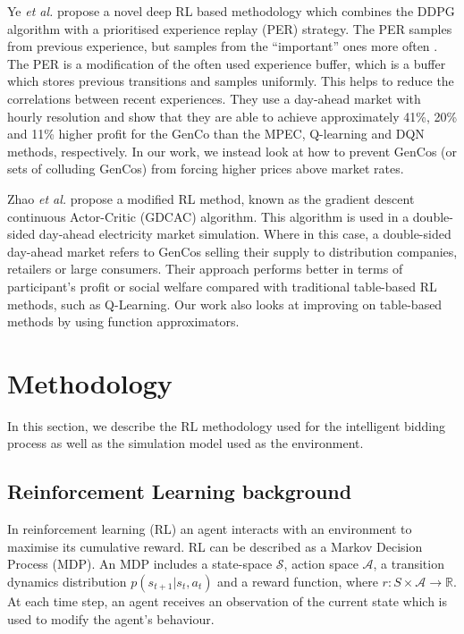Ye \textit{et al.} \cite{Ye2020a} propose a novel deep RL based methodology which combines the DDPG algorithm \cite{Hunt2016a} with a prioritised experience replay (PER) strategy\cite{schaul2015prioritized}. The PER samples from previous experience, but samples from the ``important'' ones more often \cite{Schaul2016}. The PER is a modification of the often used experience buffer, which is a buffer which stores previous transitions and samples uniformly. This helps to reduce the correlations between recent experiences. They use a day-ahead market with hourly resolution and show that they are able to achieve approximately 41\%, 20\% and 11\% higher profit for the GenCo than the MPEC, Q-learning and DQN methods, respectively. In our work, we instead look at how to prevent GenCos (or sets of colluding GenCos) from forcing higher prices above market rates.



Zhao \textit{et al.} \cite{Zhao2016} propose a modified RL method, known as the gradient descent continuous Actor-Critic (GDCAC) algorithm. This algorithm is used in a double-sided day-ahead electricity market simulation. Where in this case, a double-sided day-ahead market refers to GenCos selling their supply to distribution companies, retailers or large consumers. Their approach performs better in terms of participant's profit or social welfare compared with traditional table-based RL methods, such as Q-Learning. Our work also looks at improving on table-based methods by using function approximators.





\section{Methodology}
\label{rl:sec:material}

In this section, we describe the RL methodology used for the intelligent bidding process as well as the simulation model used as the environment.

\subsection{Reinforcement Learning background}


In reinforcement learning (RL) an agent interacts with an environment to maximise its cumulative reward. RL can be described as a Markov Decision Process (MDP). An MDP includes a state-space $\mathcal{S}$, action space $\mathcal{A}$, a transition dynamics distribution $p(s_{t+1}|s_t,a_t)$ and a reward function, where $r:S\times \mathcal{A} \rightarrow \mathbb{R}$. At each time step, an agent receives an observation of the current state which is used to modify the agent's behaviour.

